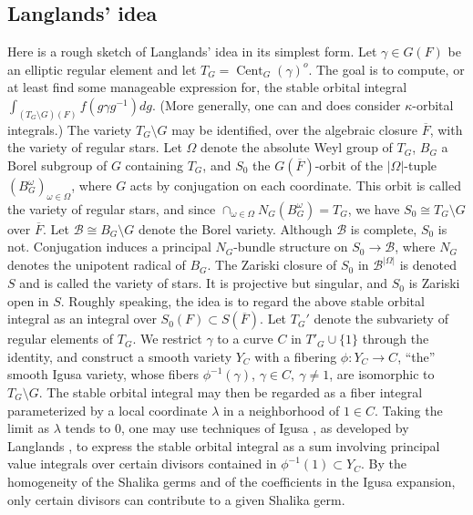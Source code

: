 \documentclass[12pt,letterpaper]{amsart}
\theoremstyle{plain}
\theoremstyle{definition}
\theoremstyle{remark}
\theoremstyle{definition}
\newcommand{\ovF}{\overline{F}}
\DeclareMathOperator{\Cent}{Cent}
\begin{document}
\subsection*{Langlands' idea}

Here is a rough sketch of Langlands' idea in its simplest form.
Let $\gamma\in G(F)$ be an elliptic regular element and let
$T_G=\Cent_G(\gamma)^o$. The goal is to compute,
or at least find some manageable expression for, the stable orbital
integral $\int_{(T_G\setminus G)(F)}f(g\gamma g^{-1})dg$.
(More generally, one can and does consider $\kappa$-orbital
integrals.) The variety $T_G\setminus G$
may be identified, over the algebraic closure
$\overline{F}$, with the variety of regular stars. Let
$\Omega$ denote the absolute Weyl group of $T_G$,
$B_G$ a Borel subgroup of $G$
containing $T_G$, and $S_0$ the $G(\ovF)$-orbit of the
$|\Omega|$-tuple $(B_G^\omega)_{\omega\in \Omega}$, where
$G$ acts by conjugation on each coordinate. This orbit is called the
variety of regular stars, and since
$\cap_{\omega\in \Omega}N_G(B_G^\omega)=T_G$,
we have $S_0\cong T_G\setminus G$ over $\ovF$. Let
${\mathcal B}\cong B_G\setminus G$
denote the Borel variety. Although ${\mathcal B}$ is complete,
$S_0$ is not. Conjugation induces a principal $N_G$-bundle structure on
$S_0\rightarrow {\mathcal B}$, where $N_G$ denotes
the unipotent radical of $B_G$.
The Zariski closure of
$S_0$ in ${\mathcal B}^{|\Omega|}$ is denoted $S$ and is called the variety of
stars. It is projective but singular, and $S_0$ is Zariski open in $S$.
Roughly speaking, the idea is to regard the above stable orbital integral
as an integral over $S_0(F)\subset S(\ovF)$. Let $T_G'$
denote the subvariety of regular elements of $T_G$. We
restrict $\gamma$ to a curve $C$ in $T'_G\cup \{1\}$
through the identity, and construct a smooth variety $Y_C$
with a fibering $\phi:Y_C\rightarrow C$, ``the''
smooth Igusa variety, whose fibers
$\phi^{-1}(\gamma)$, $\gamma\in C,\ \gamma\not= 1$,
are isomorphic to $T_G\setminus G$. The stable orbital integral
may then be regarded as a fiber integral parameterized by a
local coordinate $\lambda$ in a neighborhood of $1\in C$.
Taking the limit as $\lambda$ tends to $0$,
one may use techniques of Igusa \cite{Ig78}, as developed
by Langlands \cite{La83}, to express the stable orbital integral
as a sum involving principal value integrals over certain divisors
contained in $\phi^{-1}(1) \subset Y_C$. By the homogeneity
of the Shalika germs and of the coefficients in the Igusa expansion, only
certain divisors can contribute to a given Shalika germ.
\end{document}
